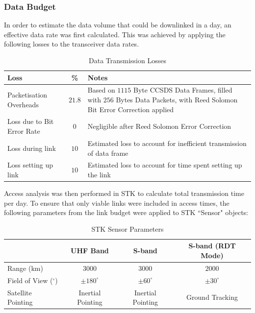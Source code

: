 \documentclass[a4paper, 11pt, conference]{IEEEtran}
\begin{document}
\subsubsection{Data Budget}


In order to estimate the data volume that could be downlinked in a day, an effective data rate was first calculated. This was achieved by applying the following losses to the transceiver data rates.

\begin{table}[H]
    \centering
    \caption{Data Transmission Losses}
    \begin{tabularx}{0.8\linewidth}{l c X} 
        \toprule
        \textbf{Loss} & \textbf{\%} & \textbf{Notes} \\
        \midrule
        Packetisation Overheads & $21.8$ & Based on $1115$ Byte CCSDS Data Frames, filled with $256$ Bytes Data Packets, with Reed Solomon Bit Error Correction applied \\
        Loss due to Bit Error Rate & $0$ & Negligible after Reed Solomon Error Correction \\
        Loss during link & $10$ & Estimated loss to account for inefficient transmission of data frame\\
        Loss setting up link & $10$ & Estimated loss to account for time spent setting up the link\\ 
        \bottomrule
    \end{tabularx}
    \label{tab:Downlink_Losses}
\end{table}

Access analysis was then performed in STK to calculate total transmission time per day. To ensure that only viable links were included in access times, the following parameters from the link budget were applied to STK ``Sensor" objects:

\begin{table}[H]
    \centering
    \caption{STK Sensor Parameters}
    \renewcommand{\arraystretch}{1} %
    \begin{tabularx}{0.65\linewidth}{l c c c} 
        \toprule
          & \textbf{UHF Band} & \textbf{S-band} & \textbf{S-band (RDT Mode)} \\
        \midrule
        Range (km) & $3000$ & $3000$ & $2000$\\
        Field of View ($^\circ$) & $\pm180^\circ$ & $\pm60^\circ$ & $\pm30^\circ$ \\
        Satellite Pointing & Inertial Pointing & Inertial Pointing & Ground Tracking\\
        \bottomrule
    \end{tabularx}
    \label{tab:data_budget_STK}
\end{table}
\end{document}

